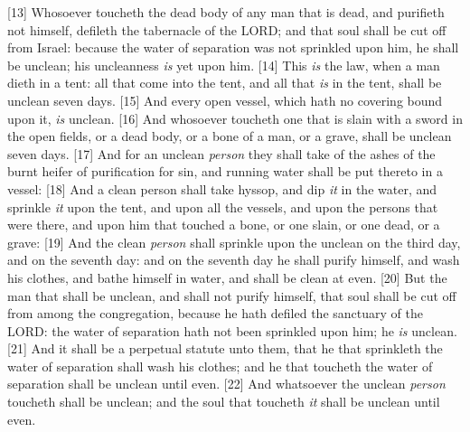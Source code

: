 [13] \textcolor[cmyk]{0.99998,1,0,0}{Whosoever toucheth the dead body of any man that is dead, and purifieth not himself, defileth the tabernacle of the LORD; and that soul shall be cut off from Israel: because the water of separation was not sprinkled upon him, he shall be unclean; his uncleanness \emph{is} yet upon him.}
[14] \textcolor[cmyk]{0.99998,1,0,0}{This \emph{is} the law, when a man dieth in a tent: all that come into the tent, and all that \emph{is} in the tent, shall be unclean seven days.}
[15] \textcolor[cmyk]{0.99998,1,0,0}{And every open vessel, which hath no covering bound upon it, \emph{is} unclean.}
[16] \textcolor[cmyk]{0.99998,1,0,0}{And whosoever toucheth one that is slain with a sword in the open fields, or a dead body, or a bone of a man, or a grave, shall be unclean seven days.}
[17] \textcolor[cmyk]{0.99998,1,0,0}{And for an unclean \emph{person} they shall take of the ashes of the burnt heifer of purification for sin, and running water shall be put thereto in a vessel:}
[18] \textcolor[cmyk]{0.99998,1,0,0}{And a clean person shall take hyssop, and dip \emph{it} in the water, and sprinkle \emph{it} upon the tent, and upon all the vessels, and upon the persons that were there, and upon him that touched a bone, or one slain, or one dead, or a grave:}
[19] \textcolor[cmyk]{0.99998,1,0,0}{And the clean \emph{person} shall sprinkle upon the unclean on the third day, and on the seventh day: and on the seventh day he shall purify himself, and wash his clothes, and bathe himself in water, and shall be clean at even.}
[20] \textcolor[cmyk]{0.99998,1,0,0}{But the man that shall be unclean, and shall not purify himself, that soul shall be cut off from among the congregation, because he hath defiled the sanctuary of the LORD: the water of separation hath not been sprinkled upon him; he \emph{is} unclean.}
[21] \textcolor[cmyk]{0.99998,1,0,0}{And it shall be a perpetual statute unto them, that he that sprinkleth the water of separation shall wash his clothes; and he that toucheth the water of separation shall be unclean until even.}
[22] \textcolor[cmyk]{0.99998,1,0,0}{And whatsoever the unclean \emph{person} toucheth shall be unclean; and the soul that toucheth \emph{it} shall be unclean until even.}
